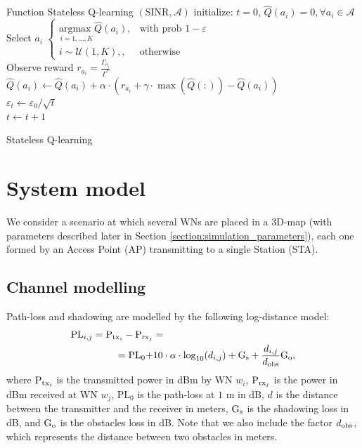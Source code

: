 \documentclass[conference]{IEEEtran}
\begin{document}
	\begin{algorithm}
		Function Stateless Q-learning $(\text{SINR},\mathcal{A})$\;
		initialize: $t=0$, $\hat{Q}(a_i) = 0, \forall a_i \in \mathcal{A}$\\
		{
			Select $a_i$  $\begin{cases}
			\underset{i=1,...,K}{\text{argmax }} \hat{Q}(a_i), & \text{with prob } 1 - \varepsilon\\
			i \sim \mathcal{U}(1, K),, & \text{otherwise}
			\end{cases}$\\
			Observe reward $r_{a_i} = \frac{\Gamma_{a_i}}{\Gamma^*}$ \\
			$\hat{Q}(a_i) \leftarrow \hat{Q}(a_i) + \alpha \cdot (r_{a_i} + \gamma \cdot \max(\hat{Q}(:)) - \hat{Q}(a_i))$\\
			$\varepsilon_t \leftarrow \varepsilon_0 / \sqrt{t}$ \\	
			$ t \leftarrow t + 1$
		}
		\caption{Stateless Q-learning}
		\label{alg:qlearning}
	\end{algorithm}
	
	\section{System model}
	\label{section:system_model}	
	We consider a scenario at which several WNs are placed in a 3D-map (with parameters described later in Section \ref{section:simulation_parameters}), each one formed by an Access Point (AP) transmitting to a single Station (STA). 
	
	\subsection{Channel modelling}
	\label{section:channel_modelling}
	
	Path-loss and shadowing are modelled by the following log-distance model:	
	\begin{align}
	\text{PL}_{i,j} = \text{P}_{{\rm tx}_i} - \text{P}_{{\rm rx}_j} & = \nonumber \\ = \text{PL}_0 + & 10 \cdot \alpha \cdot \log_{10}(d_{i,j}) + \text{G}_{{\rm s}} + \frac{d_{i,j}}{d_{{\rm obs}}} \text{G}_{{\rm o}}, \nonumber
	\end{align}
	where $\text{P}_{{\rm tx}_i}$ is the transmitted power in dBm by WN $w_i$, $\text{P}_{{\rm rx}_j}$ is the power in dBm received at WN $w_j$, $\text{PL}_0$ is the path-loss at $1$ m in dB, $d$ is the distance between the transmitter and the receiver in meters, $\text{G}_{{\rm s}}$ is the shadowing loss in dB, and $\text{G}_{{\rm o}}$ is the obstacles loss in dB. Note that we also include the factor $d_{{\rm obs}}$, which represents the distance between two obstacles in meters. 
	
\end{document}
